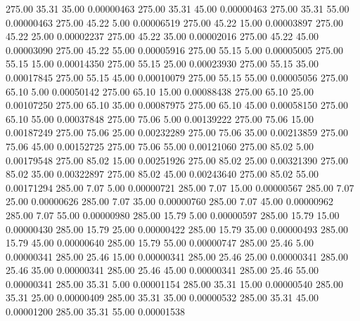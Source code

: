     275.00     35.31     35.00     0.00000463
    275.00     35.31     45.00     0.00000463
    275.00     35.31     55.00     0.00000463
    275.00     45.22      5.00     0.00006519
    275.00     45.22     15.00     0.00003897
    275.00     45.22     25.00     0.00002237
    275.00     45.22     35.00     0.00002016
    275.00     45.22     45.00     0.00003090
    275.00     45.22     55.00     0.00005916
    275.00     55.15      5.00     0.00005005
    275.00     55.15     15.00     0.00014350
    275.00     55.15     25.00     0.00023930
    275.00     55.15     35.00     0.00017845
    275.00     55.15     45.00     0.00010079
    275.00     55.15     55.00     0.00005056
    275.00     65.10      5.00     0.00050142
    275.00     65.10     15.00     0.00088438
    275.00     65.10     25.00     0.00107250
    275.00     65.10     35.00     0.00087975
    275.00     65.10     45.00     0.00058150
    275.00     65.10     55.00     0.00037848
    275.00     75.06      5.00     0.00139222
    275.00     75.06     15.00     0.00187249
    275.00     75.06     25.00     0.00232289
    275.00     75.06     35.00     0.00213859
    275.00     75.06     45.00     0.00152725
    275.00     75.06     55.00     0.00121060
    275.00     85.02      5.00     0.00179548
    275.00     85.02     15.00     0.00251926
    275.00     85.02     25.00     0.00321390
    275.00     85.02     35.00     0.00322897
    275.00     85.02     45.00     0.00243640
    275.00     85.02     55.00     0.00171294
    285.00      7.07      5.00     0.00000721
    285.00      7.07     15.00     0.00000567
    285.00      7.07     25.00     0.00000626
    285.00      7.07     35.00     0.00000760
    285.00      7.07     45.00     0.00000962
    285.00      7.07     55.00     0.00000980
    285.00     15.79      5.00     0.00000597
    285.00     15.79     15.00     0.00000430
    285.00     15.79     25.00     0.00000422
    285.00     15.79     35.00     0.00000493
    285.00     15.79     45.00     0.00000640
    285.00     15.79     55.00     0.00000747
    285.00     25.46      5.00     0.00000341
    285.00     25.46     15.00     0.00000341
    285.00     25.46     25.00     0.00000341
    285.00     25.46     35.00     0.00000341
    285.00     25.46     45.00     0.00000341
    285.00     25.46     55.00     0.00000341
    285.00     35.31      5.00     0.00001154
    285.00     35.31     15.00     0.00000540
    285.00     35.31     25.00     0.00000409
    285.00     35.31     35.00     0.00000532
    285.00     35.31     45.00     0.00001200
    285.00     35.31     55.00     0.00001538
